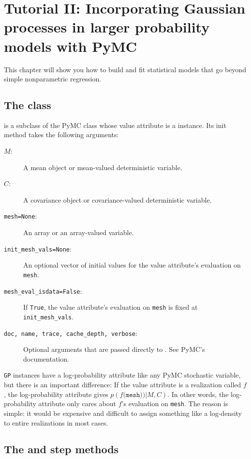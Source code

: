 \chapter{Tutorial II: Incorporating Gaussian processes in larger probability models with PyMC}\label{cha:PyMC}

This chapter will show you how to build and fit statistical models that go beyond simple nonparametric regression.

\section{The  class}
 is a subclass of the PyMC  class whose value attribute is a  instance. Its init method takes the following arguments:
\begin{description}
    \item[$M$:] A mean object or mean-valued deterministic variable.
    \item[$C$:] A covariance object or covariance-valued deterministic variable.
    \item[\texttt{mesh=None}:] An array or an array-valued variable.
    \item[\texttt{init_mesh_vals=None}:] An optional vector of initial values for the value attribute's evaluation on \texttt{mesh}.
    \item[\texttt{mesh_eval_isdata=False}:] If \texttt{True}, the value attribute's evaluation on \texttt{mesh} is fixed at \texttt{init_mesh_vals}.
    \item[\texttt{doc, name, trace, cache_depth, verbose}:] Optional arguments that are passed directly to . See PyMC's documentation.
\end{description}

\texttt{GP} instances have a log-probability attribute like any PyMC stochastic variable, but there is an important difference: If the value attribute is a realization called $f$, the log-probability attribute gives $p(f\texttt{(mesh))}|M,C)$. In other words, the log-probability attribute only cares about $f$'s evaluation on \texttt{mesh}. The reason is simple: it would be expensive and difficult to assign something like a log-density to entire realizations in most cases.

\section{The  and  step methods}

